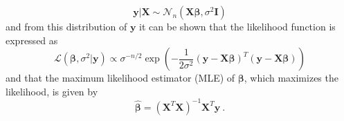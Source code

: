 \begin{equation}
    \mathbf{y} \lvert \mathbf{X} \sim \mathcal{N}_n(\mathbf{X}\boldsymbol{\beta}, \sigma^2 \mathbf{I})
\end{equation}
and from this distribution of $\mathbf{y}$ it can be shown that the likelihood function is expressed as
\begin{equation}
    \mathcal{L}(\boldsymbol{\beta}, \sigma^2 \lvert \mathbf{y}) \propto \sigma^{-n/2}\exp\left(-\frac{1}{2\sigma^2}(\mathbf{y}-\mathbf{X}\boldsymbol{\beta})^T(\mathbf{y}-\mathbf{X}\boldsymbol{\beta})\right)
\end{equation}
and that the maximum likelihood estimator (MLE) of $\boldsymbol{\beta}$, which maximizes the likelihood, is given by
\begin{equation}
    \label{eq:beta_hat}
    \hat{\boldsymbol{\beta}} = (\mathbf{X}^T\mathbf{X})^{-1}\mathbf{X}^T\mathbf{y} \ .
\end{equation}

